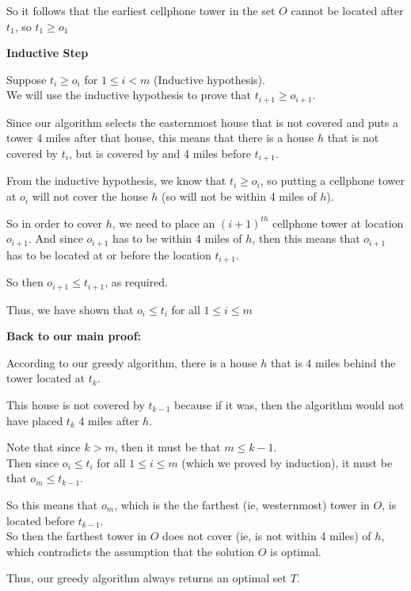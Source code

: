 \documentclass{article}
\begin{document}
So it follows that the earliest cellphone tower in the set $O$ cannot be located after $t_1$, so $t_1 \geq o_1$

\textbf{Inductive Step}

Suppose $t_i \geq o_i$ for $1 \leq i < m$ (Inductive hypothesis).\\
We will use the inductive hypothesis to prove that $t_{i+1} \geq o_{i+1}$.

Since our algorithm selects the easternmost house that is not covered and puts a tower 4 miles after that house, this means that there is a house $h$ that is not covered by $t_i$, but is covered by and 4 miles before $t_{i+1}$.

From the inductive hypothesis, we know that $t_i \geq o_i$, so putting a cellphone tower at $o_i$ will not cover the house $h$ (so will not be within 4 miles of $h$).

So in order to cover $h$, we need to place an $(i+1)^{th}$ cellphone tower at location $o_{i+1}$.
And since $o_{i+1}$ has to be within 4 miles of $h$, then this means that $o_{i+1}$ has to be located at or before the location $t_{i+1}$.

So then $o_{i+1} \leq t_{i+1}$, as required.

Thus, we have shown that $o_i \leq t_i$ for all $1 \leq i \leq m$


\textbf{Back to our main proof:}

According to our greedy algorithm, there is a house $h$ that is 4 miles behind the tower located at $t_k$.

This house is not covered by $t_{k-1}$ because if it was, then the algorithm would not have placed $t_k$ 4 miles after $h$.

Note that since $k > m$, then it must be that $m \leq k-1$.\\
Then since $o_i \leq t_i$ for all $1 \leq i \leq m$ (which we proved by induction), it must be that $o_m \leq t_{k-1}$.

So this means that $o_m$, which is the the farthest (ie, westernmost) tower in $O$, is located before $t_{k-1}$.\\
So then the farthest tower in $O$ does not cover (ie, is not within 4 miles) of $h$, which contradicts the assumption that the solution $O$ is optimal.

Thus, our greedy algorithm always returns an optimal set $T$.
\end{document}
